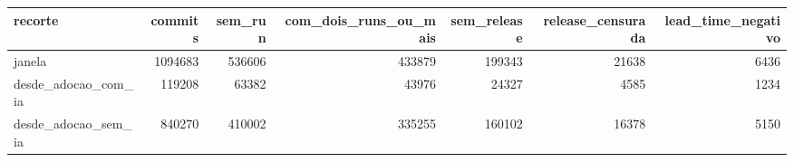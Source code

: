 \begin{tabular}{lrrrrrr}
\toprule
recorte & commits & sem_run & com_dois_runs_ou_mais & sem_release & release_censurada & lead_time_negativo \\
\midrule
janela & 1094683 & 536606 & 433879 & 199343 & 21638 & 6436 \\
desde_adocao_com_ia & 119208 & 63382 & 43976 & 24327 & 4585 & 1234 \\
desde_adocao_sem_ia & 840270 & 410002 & 335255 & 160102 & 16378 & 5150 \\
\bottomrule
\end{tabular}
